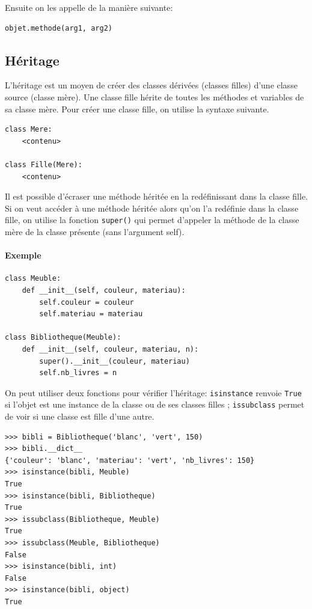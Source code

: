 \documentclass[a4paper, french, 10pt]{article}
\newcommand{\code}[1]{{\small\texttt{#1}}}
\begin{document}
Ensuite on les appelle de la manière suivante:
\begin{verbatim}
objet.methode(arg1, arg2)
\end{verbatim}


\subsection{Héritage}

L'héritage est un moyen de créer des classes dérivées (classes filles) d'une classe source (classe mère). Une classe fille hérite de toutes les méthodes et variables de sa classe mère. Pour créer une classe fille, on utilise la syntaxe suivante.

\begin{verbatim}
class Mere:
    <contenu>

class Fille(Mere):
    <contenu>
\end{verbatim}

Il est possible d'écraser une méthode héritée en la redéfinissant dans la classe fille. Si on veut accéder à une méthode héritée alors qu'on l'a redéfinie dans la classe fille, on utilise la fonction \code{super()} qui permet d'appeler la méthode de la classe mère de la classe présente (sans l'argument self).

\paragraph{Exemple}
\begin{verbatim}
class Meuble:
    def __init__(self, couleur, materiau):
        self.couleur = couleur
        self.materiau = materiau

class Bibliotheque(Meuble):
    def __init__(self, couleur, materiau, n):
        super().__init__(couleur, materiau)
        self.nb_livres = n
\end{verbatim}
On peut utiliser deux fonctions pour vérifier l'héritage: \code{isinstance} renvoie \code{True} si l'objet est une instance de la classe ou de ses classes filles ; \code{issubclass} permet de voir si une classe est fille d'une autre.

\begin{Verbatim}[frame = single, fontsize = \footnotesize]
>>> bibli = Bibliotheque('blanc', 'vert', 150)
>>> bibli.__dict__
{'couleur': 'blanc', 'materiau': 'vert', 'nb_livres': 150}
>>> isinstance(bibli, Meuble)
True
>>> isinstance(bibli, Bibliotheque)
True
>>> issubclass(Bibliotheque, Meuble)
True
>>> issubclass(Meuble, Bibliotheque)
False
>>> isinstance(bibli, int)
False
>>> isinstance(bibli, object)
True
\end{Verbatim}
\end{document}
